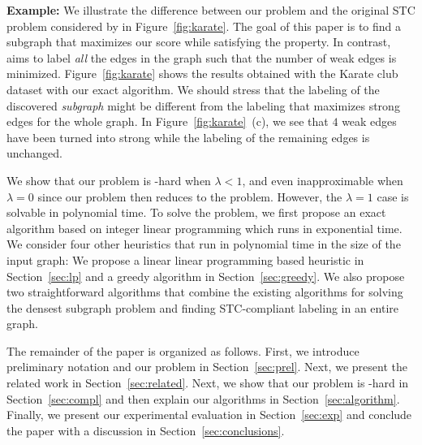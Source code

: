

\textbf{Example:} 
We illustrate the difference between our problem and the original STC problem considered by \citet{sintos2014using} in Figure~\ref{fig:karate}.
The goal of this paper is to find a subgraph that maximizes our score while satisfying the \stc property. In contrast, \citet{sintos2014using} aims to label \emph{all} the edges in the graph such that the number of weak edges is minimized.
Figure~\ref{fig:karate} shows the results obtained with the Karate club dataset with our exact algorithm. We should stress that the labeling of the discovered \emph{subgraph} might be different from the labeling that maximizes strong edges for the whole graph. In Figure~\ref{fig:karate}~(c), we see that $4$ weak edges have been turned into strong while the labeling of the remaining edges is unchanged.

We show that our problem is \np-hard when $\lambda < 1$, and even inapproximable when $\lambda = 0$ since our problem then reduces to the \prbmaxclique problem. However, the $\lambda =  1$ case is solvable in polynomial time. To solve the problem,
we first propose an exact algorithm based on integer linear programming which runs in exponential time.  We consider four other heuristics that run in polynomial time in the size of the input graph:
We propose a linear linear programming based heuristic in Section~\ref{sec:lp}
and a greedy algorithm in Section~\ref{sec:greedy}.
We also propose two straightforward algorithms that combine the existing algorithms for solving the densest subgraph problem and finding STC-compliant labeling in an entire graph.

The remainder of the paper is organized as follows.
First, we introduce preliminary notation and our problem in Section~\ref{sec:prel}.
Next, we present the related work in Section~\ref{sec:related}.
Next, we show that our problem is \np-hard in Section~\ref{sec:compl} and then explain our algorithms in Section~\ref{sec:algorithm}.
Finally, we present our experimental evaluation in Section~\ref{sec:exp} and conclude the paper with a discussion in Section~\ref{sec:conclusions}.